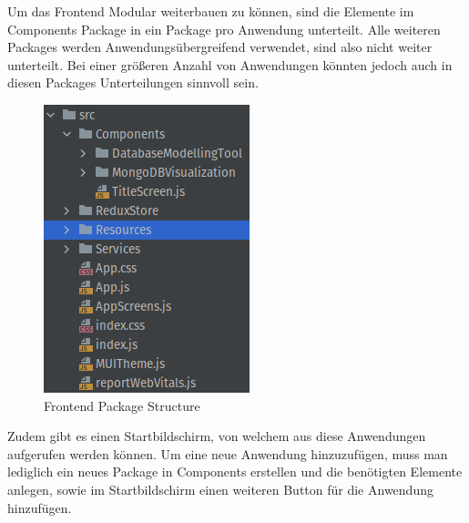Um das Frontend Modular weiterbauen zu können, sind die Elemente im Components Package in ein Package pro Anwendung unterteilt.
Alle weiteren Packages werden Anwendungsübergreifend verwendet, sind also nicht weiter unterteilt.
Bei einer größeren Anzahl von Anwendungen könnten jedoch auch in diesen Packages Unterteilungen sinnvoll sein.

\begin{figure}[H]
    \includegraphics[width=\textwidth / 3]{images/frontend_package_structure}
    \caption{Frontend Package Structure}
    \label{fig:frontend_package_structure}
\end{figure}

Zudem gibt es einen Startbildschirm, von welchem aus diese Anwendungen aufgerufen werden können.
Um eine neue Anwendung hinzuzufügen, muss man lediglich ein neues Package in Components erstellen und die benötigten Elemente anlegen, sowie im Startbildschirm einen weiteren Button für die Anwendung hinzufügen.

